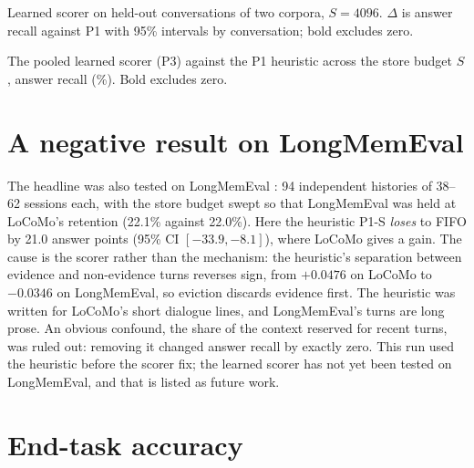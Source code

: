 \begin{table}[htbp]
\caption[Learned scorer on held-out conversations of two corpora, $S=4096$.]{Learned scorer on held-out conversations of two corpora, $S=4096$.
$\Delta$ is answer recall against P1 with 95\% intervals by conversation; bold
excludes zero.}
\label{tab:transfer}
\centering
\fontsize{10}{12}\selectfont
\begin{adjustbox}{max width=\textwidth}\end{adjustbox}
\end{table}

\begin{table}[htbp]
\caption[The pooled learned scorer (P3) against the P1 heuristic across the store budget $S$, answer recall (\%).]{The pooled learned scorer (P3) against the P1 heuristic across the
store budget $S$, answer recall (\%). Bold excludes zero.}
\label{tab:transfer-budget}
\centering
\fontsize{10}{12}\selectfont
\begin{adjustbox}{max width=\textwidth}\end{adjustbox}
\end{table}

\section{A negative result on LongMemEval}
\label{sec:lme}

The headline was also tested on LongMemEval \cite{wu2024longmemeval}: 94
independent histories of 38--62 sessions each, with the store budget swept so
that LongMemEval was held at LoCoMo's retention (22.1\% against 22.0\%). Here
the heuristic P1-S \emph{loses} to FIFO by 21.0 answer points (95\% CI
$[-33.9,-8.1]$), where LoCoMo gives a gain. The cause is the scorer rather than
the mechanism: the heuristic's separation between evidence and non-evidence
turns reverses sign, from $+0.0476$ on LoCoMo to $-0.0346$ on LongMemEval, so
eviction discards evidence first. The heuristic was written for LoCoMo's
short dialogue lines, and LongMemEval's turns are long prose. An obvious
confound, the share of the context reserved for recent turns, was ruled out:
removing it changed answer recall by exactly zero. This run used the
heuristic before the scorer fix; the learned scorer has not yet been tested on
LongMemEval, and that is listed as future work.

\section{End-task accuracy}
\label{sec:endtask}

